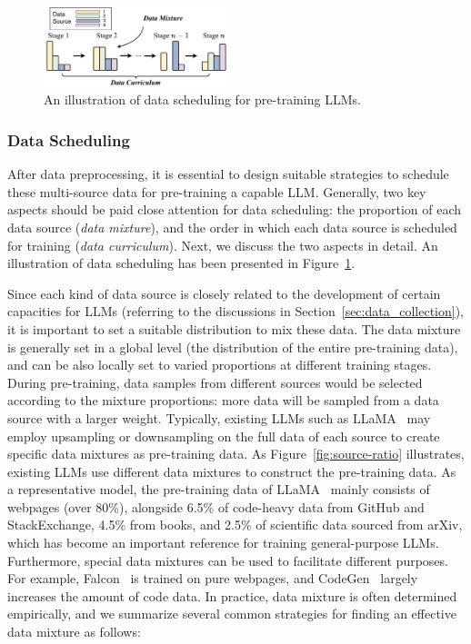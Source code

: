 {\begin{figure}
    \centering
    \includegraphics[width=0.48\textwidth]{images/data_schedule.pdf}
    \caption{An illustration of  data scheduling for pre-training LLMs. }
    \label{fig:data_schedule}
\end{figure}

\subsubsection{Data Scheduling}
\label{sec:data_scheduling}
After data preprocessing, it is essential to design suitable strategies to schedule these multi-source data  for pre-training a capable LLM. Generally, two key aspects should be paid close attention for data scheduling: the proportion of each data source (\emph{data mixture}), and the order in which each data source is scheduled for training (\emph{data curriculum}).
Next, we discuss the two aspects in detail. An illustration of data scheduling has been presented in Figure~\ref{fig:data_schedule}.

 Since each kind of data source is closely related to the development of certain capacities for  LLMs (referring to the discussions in Section~\ref{sec:data_collection}), it is important to set a suitable  distribution to mix these data. 
 The data mixture is generally set in a global level (\ie the distribution of the entire pre-training data), and can be also locally set to varied  proportions at different training stages. 
 During pre-training, data samples from different sources would be selected according to the mixture proportions: more data will be sampled from a data source with a larger weight.  
Typically, existing LLMs such as LLaMA~\cite{Touvron-arxiv-2023-LLaMA} may employ upsampling or downsampling on the full data of each source to create specific data mixtures as pre-training data. 
As Figure~\ref{fig:source-ratio} illustrates, existing LLMs use different data mixtures to construct the pre-training data.  
As a representative model, the pre-training data of LLaMA~\cite{Touvron-arxiv-2023-LLaMA} mainly consists of webpages (over 80\%),  alongside 6.5\% of code-heavy data from GitHub and StackExchange, 4.5\% from books, and 2.5\% of scientific data sourced from arXiv, which has become an important reference for training  general-purpose LLMs. 
Furthermore, special data mixtures can be used to facilitate different   purposes. For example,  Falcon~\cite{Penedo-2023-arxiv-Refinedweb} is trained on pure webpages,   and CodeGen~\cite{nijkamp-arxiv-2022-Codegen} largely increases the amount of code data. 
In practice, data mixture is often determined empirically, and we summarize several common strategies for finding an effective data mixture as follows: 


}
